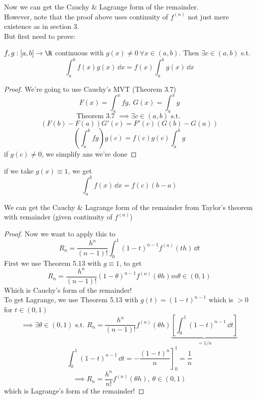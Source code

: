 \begin{remark}
Now we can get the Cauchy \& Lagrange form of the remainder.\\
However, note that the proof above uses continuity of $f^{(n)}$ not just mere existence as in section 3.\\
But first need to prove:
\end{remark}
\begin{theorem}
$f,g:[a,b]\to \R$ continuous with $g(x) \neq 0 \ \forall x\in (a,b)$. Then $\exists c\in (a,b)$ s.t.
\[\int_a^bf(x)g(x)\,\dd x = f(x)\int_a^bg(x)\,\dd x\]
\begin{proof}
We're going to use Cauchy's MVT (Theorem 3.7)
\[F(x) = \int_a^x fg, \ G(x) = \int_a^x g\]
\[\text{Theorem 3.7 }\implies \exists c\in (a,b) \text{ s.t. }\]
\[(F(b) - F(a))G'(c) = F'(c)(G(b) - G(a))\]
\[\left(\int_a^b fg\right)g(c) = f(c)g(c)\int_a^bg\]
if $g(c)\neq 0$, we simplify ans we're done
\end{proof}
\begin{note}
if we take $g(x) \equiv 1$, we get
\[\int_a^b f(x)\,\dd x= f(c)(b-a)\]
\end{note}
\end{theorem}
\begin{claim}
We can get the Cauchy \& Lagrange form of the remainder from Taylor's theorem with remainder (given continuity of $f^{(n)}$)
\begin{proof}
Now we want to apply this to 
\[R_n = \frac{h^n}{(n-1)!}\int_0^1(1-t)^{n-1}f^{(n)}(th)\,\dd t\]
First we use Theorem 5.13 with $g \equiv 1$, to get
\[R_n = \frac{h^n}{(n-1)!}(1-\theta)^{n-1}f^{(n)}(\theta h)m \theta\in (0,1)\]
Which is Cauchy's form of the remainder!\\
To get Lagrange, we use Theorem 5.13 with $g(t) = (1-t)^{n-1}$ which is $>0$ for $t\in (0,1)$
\[\implies\exists \theta\in (0,1)\text{ s.t. } R_n = \frac{h^n}{(n-1)!} f^{(n)}(\theta h)\underbrace{\left[\int_0^1(1-t)^{n-1}\,\dd t\right]}_{=1/n}\]
\[\int_0^1(1-t)^{n-1}\,\dd t = \left.-\frac{(1-t)^n}{n}\right]_0^1 = \frac{1}{n}\]
\[\implies R_n = \frac{h^n}{n!}f^{(n)}(\theta h), \ \theta \in (0,1)\]
which is Lagrange's form of the remainder!
\end{proof}
\end{claim}
